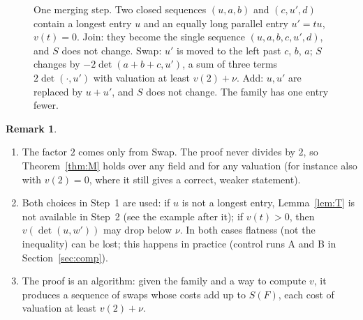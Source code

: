 \documentclass[11pt]{article}
\theoremstyle{definition}
\newtheorem{remark}[theorem]{Remark}
\begin{document}
\begin{figure}[ht]
\centering
{}
\caption{One merging step. Two closed sequences $(u,a,b)$ and $(c,u',d)$ contain a longest
entry $u$ and an equally long parallel entry $u'=tu$, $v(t)=0$. Join: they become the single sequence
$(u,a,b,c,u',d)$, and $S$ does not change. Swap: $u'$ is moved to the left past $c$, $b$, $a$; $S$
changes by $-2\det(a+b+c,u')$, a sum of three terms $2\det(\cdot,u')$ with valuation at least
$v(2)+\nu$. Add: $u,u'$ are replaced by $u+u'$, and $S$ does not change. The family has one entry
fewer.}\label{fig:merge}
\end{figure}

\begin{remark}\label{rem:M}
\begin{enumerate}[label=(\alph*)]
\item The factor $2$ comes only from Swap. The proof never divides by $2$, so Theorem~\ref{thm:M}
holds over any field and for any valuation (for instance also with $v(2)=0$, where it still gives a
correct, weaker statement).
\item Both choices in Step~1 are used: if $u$ is not a longest entry, Lemma~\ref{lem:T} is not
available in Step~2 (see the example after it); if $v(t)>0$, then $v(\det(u,w'))$ may drop below
$\nu$. In both cases flatness (not the inequality) can be lost; this happens in practice (control runs A and B in
Section~\ref{sec:comp}).
\item The proof is an algorithm: given the family and a way to compute $v$, it produces a sequence of
swaps whose costs add up to $S(F)$, each cost of valuation at least $v(2)+\nu$.
\end{enumerate}
\end{remark}
\end{document}
